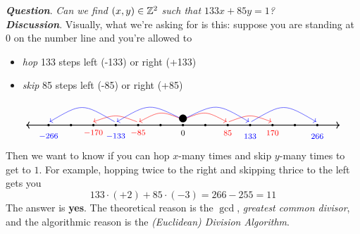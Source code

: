 \vspace*{0.5em}

\emph{\textbf{Question}}. \textit{Can we find $(x,y) \in \mathbb Z^2$ such that $133x + 85y = 1$?}\\[0.5em]
\emph{\textbf{Discussion}}. Visually, what we're asking for is this: suppose you are standing at $0$ on the number line and you're allowed to
\begin{itemize}
\item \emph{\color{blue} hop} 133 steps left (-133) or right (+133)
\item \emph{\color{red} skip} 85 steps left (-85) or right (+85)
\end{itemize}
\vspace*{1em}
\[\begin{tikzpicture}[scale=0.8]
    \draw[<->,thick] (-7,0)--(7,0);
	\foreach \x in {-6,-5,-4,-3,-2,-1,0,1,2,3,4,5,6}
    {
    \fill (\x,0) circle (1.5pt);
    }
    \node[] at (0,-0.35) {\footnotesize$0$};
    \node[] at (2,-0.35) {\footnotesize\color{red}$85$};
    \node[] at (4,-0.35) {\footnotesize\color{red}$170$};
    \node[] at (-2,-0.35) {\footnotesize\color{red}$-85$};
    \node[] at (-4,-0.35) {\footnotesize\color{red}$-170$};
    \node[] at (3,-0.5) {\footnotesize\color{blue}$133$};
    \node[] at (6,-0.5) {\footnotesize\color{blue}$266$};
    \node[] at (-3,-0.5) {\footnotesize\color{blue}$-133$};
    \node[] at (-6,-0.5) {\footnotesize\color{blue}$-266$};
    \draw[red,->] (0,0.25) .. controls (1,0.65) .. (1.95,0.15);    
    \draw[red,->] (2.05,0.15) .. controls (3,0.5) .. (3.95,0.15);    
    \draw[red,->] (0,0.25) .. controls (-1,0.65) .. (-1.95,0.15);    
    \draw[red,->] (-2.05,0.15) .. controls (-3,0.5) .. (-4,0.15);    
    \draw[blue,->] (0,0.25) .. controls (1.5,1) .. (2.95,0.15);    
    \draw[blue,->] (3.05,0.15) .. controls (4.5,1) .. (5.95,0.15);    
    \draw[blue,->] (0,0.25) .. controls (-1.5,1) .. (-2.95,0.15);    
    \draw[blue,->] (-3.05,0.15) .. controls (-4.5,1) .. (-5.95,0.15);    
    \fill[] (0,0.3) circle (0.5em);
	\end{tikzpicture}\]
Then we want to know if you can hop $x$-many times and skip $y$-many times to get to $1$. For example, hopping twice to the right and skipping thrice to the left gets you
\[133\cdot (+2) + 85\cdot (-3) = 266 - 255 = 11\]
The answer is \textbf{yes}. The theoretical reason is the $\gcd$, \emph{greatest common divisor}, and the algorithmic reason is the \emph{(Euclidean) Division Algorithm}.

\vspace*{2em}

